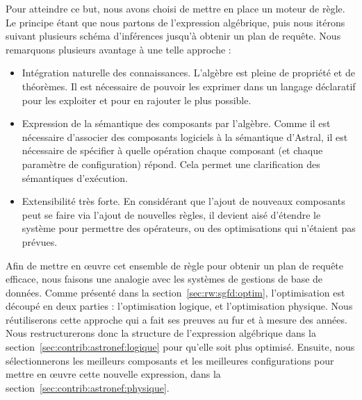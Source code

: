 Pour atteindre ce but, nous avons choisi de mettre en place un moteur de règle. Le principe étant que nous partons de l'expression algébrique, puis nous itérons suivant plusieurs schéma d'inférences jusqu'à obtenir un plan de requête. Nous remarquons plusieurs avantage à une telle approche :
\begin{itemize}
	\item Intégration naturelle des connaissances. L'algèbre est pleine de propriété et de théorèmes. Il est nécessaire de pouvoir les exprimer dans un langage déclaratif pour les exploiter et pour en rajouter le plus possible.
	\item Expression de la sémantique des composants par l'algèbre. Comme il est nécessaire d'associer des composants logiciels à la sémantique d'Astral, il est nécessaire de spécifier à quelle opération chaque composant (et chaque paramètre de configuration) répond. Cela permet une clarification des sémantiques d'exécution.
	\item Extensibilité très forte. En considérant que l'ajout de nouveaux composants peut se faire via l'ajout de nouvelles règles, il devient aisé d'étendre le système pour permettre des opérateurs, ou des optimisations qui n'étaient pas prévues.
\end{itemize}

Afin de mettre en œuvre cet ensemble de règle pour obtenir un plan de requête efficace, nous faisons une analogie avec les systèmes de gestions de base de données. Comme présenté dans la section~\ref{sec:rw:sgfd:optim}, l'optimisation est découpé en deux parties : l'optimisation logique, et l'optimisation physique. Nous réutiliserons cette approche qui a fait ses preuves au fur et à mesure des années. Nous restructurerons donc la structure de l'expression algébrique dans la section~\ref{sec:contrib:astronef:logique} pour qu'elle soit plus optimisé. Ensuite, nous sélectionnerons les meilleurs composants et les meilleures configurations pour mettre en œuvre cette nouvelle expression, dans la section~\ref{sec:contrib:astronef:physique}.

